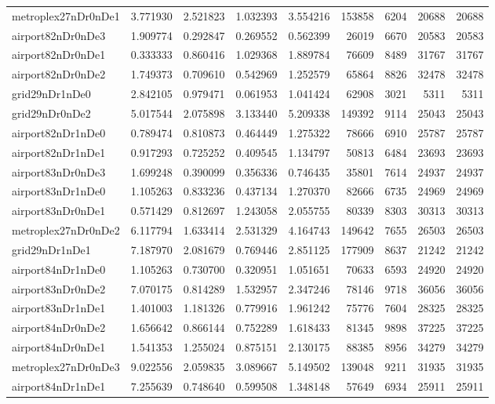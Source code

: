 \begin{longtable}{|l|r|r|r|r|r|r|r|r|}
metroplex27nDr0nDe1 & 3.771930 & 2.521823 & 1.032393 & 3.554216 & 153858 & 6204 & 20688 & 20688 \\
airport82nDr0nDe3 & 1.909774 & 0.292847 & 0.269552 & 0.562399 & 26019 & 6670 & 20583 & 20583 \\
airport82nDr0nDe1 & 0.333333 & 0.860416 & 1.029368 & 1.889784 & 76609 & 8489 & 31767 & 31767 \\
airport82nDr0nDe2 & 1.749373 & 0.709610 & 0.542969 & 1.252579 & 65864 & 8826 & 32478 & 32478 \\
grid29nDr1nDe0 & 2.842105 & 0.979471 & 0.061953 & 1.041424 & 62908 & 3021 & 5311 & 5311 \\
grid29nDr0nDe2 & 5.017544 & 2.075898 & 3.133440 & 5.209338 & 149392 & 9114 & 25043 & 25043 \\
airport82nDr1nDe0 & 0.789474 & 0.810873 & 0.464449 & 1.275322 & 78666 & 6910 & 25787 & 25787 \\
airport82nDr1nDe1 & 0.917293 & 0.725252 & 0.409545 & 1.134797 & 50813 & 6484 & 23693 & 23693 \\
airport83nDr0nDe3 & 1.699248 & 0.390099 & 0.356336 & 0.746435 & 35801 & 7614 & 24937 & 24937 \\
airport83nDr1nDe0 & 1.105263 & 0.833236 & 0.437134 & 1.270370 & 82666 & 6735 & 24969 & 24969 \\
airport83nDr0nDe1 & 0.571429 & 0.812697 & 1.243058 & 2.055755 & 80339 & 8303 & 30313 & 30313 \\
metroplex27nDr0nDe2 & 6.117794 & 1.633414 & 2.531329 & 4.164743 & 149642 & 7655 & 26503 & 26503 \\
grid29nDr1nDe1 & 7.187970 & 2.081679 & 0.769446 & 2.851125 & 177909 & 8637 & 21242 & 21242 \\
airport84nDr1nDe0 & 1.105263 & 0.730700 & 0.320951 & 1.051651 & 70633 & 6593 & 24920 & 24920 \\
airport83nDr0nDe2 & 7.070175 & 0.814289 & 1.532957 & 2.347246 & 78146 & 9718 & 36056 & 36056 \\
airport83nDr1nDe1 & 1.401003 & 1.181326 & 0.779916 & 1.961242 & 75776 & 7604 & 28325 & 28325 \\
airport84nDr0nDe2 & 1.656642 & 0.866144 & 0.752289 & 1.618433 & 81345 & 9898 & 37225 & 37225 \\
airport84nDr0nDe1 & 1.541353 & 1.255024 & 0.875151 & 2.130175 & 88385 & 8956 & 34279 & 34279 \\
metroplex27nDr0nDe3 & 9.022556 & 2.059835 & 3.089667 & 5.149502 & 139048 & 9211 & 31935 & 31935 \\
airport84nDr1nDe1 & 7.255639 & 0.748640 & 0.599508 & 1.348148 & 57649 & 6934 & 25911 & 25911 \\

\end{longtable}
